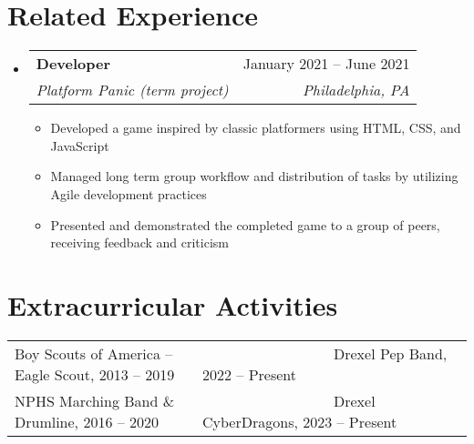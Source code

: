 \documentclass[letterpaper,11pt]{article}
\makeatletter
\newcommand{\resumeItem}[1]{
    \item{
        {#1 \vspace{-1pt}}
    }
}
\newcommand{\resumeSubheading}[4]{
	\vspace{-2pt}\item
		\begin{tabular*}{1\textwidth}[t]{l@{\extracolsep{\fill}}r}
			\textbf{#1} & #2 \\
			\textit{#3} & \textit{#4} \\
		\end{tabular*}\vspace{-7pt}
}
\newcommand{\resumeSubHeadingListStart}{\begin{itemize}[leftmargin=0in, label={}]}
\newcommand{\resumeSubHeadingListEnd}{\end{itemize}}
\newcommand{\resumeItemListStart}{\begin{itemize}[leftmargin=0.2in]}
\newcommand{\resumeItemListEnd}{\end{itemize}\vspace{-2pt}}
\makeatother
\begin{document}
\section{\textcolor{HeaderColor}{\textbf{\large Related Experience}}}
\resumeSubHeadingListStart
\resumeSubheading
{Developer}{January 2021 -- June 2021}
{Platform Panic (term project)}{Philadelphia, PA}
\resumeItemListStart
\resumeItem{Developed a game inspired by classic platformers using HTML, CSS, and JavaScript}
\resumeItem{Managed long term group workflow and distribution of tasks by utilizing Agile development practices}
\resumeItem{Presented and demonstrated the completed game to a group of peers, receiving feedback and criticism}
\resumeItemListEnd

\resumeSubHeadingListEnd

\section{\textcolor{HeaderColor}{\textbf{\large Extracurricular Activities}}}
\begin{itemize}[leftmargin=0in, label={}]
	{\item{
		\begin{tabular}{l l}
		        {Boy Scouts of America -- Eagle Scout, 2013 -- 2019} & {~~~~~~~~~~~~~~~~~~Drexel Pep Band, 2022 -- Present}\\
			    {NPHS Marching Band \& Drumline, 2016 -- 2020} & {~~~~~~~~~~~~~~~~~~Drexel CyberDragons, 2023 -- Present}
		\end{tabular}
	}}
\end{itemize}

\end{document}

